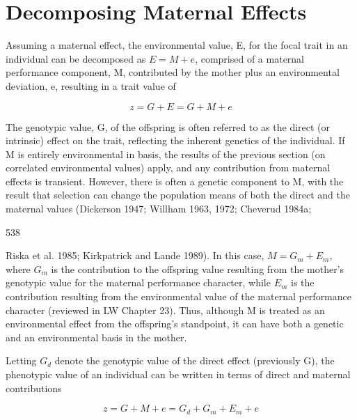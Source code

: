 \documentclass{article}
\begin{document}
\section{Decomposing Maternal Effects}
Assuming a maternal effect, the environmental value, E, for the focal trait in an individual can be decomposed as  $ E = M + e $, comprised of a maternal performance component, M, contributed by the mother plus an environmental deviation, e, resulting in a trait value of

\begin{equation}
z=G+E=G+M+e
\tag{15.20a}
\label{eq:15_20a}
\end{equation}

The genotypic value, G, of the offspring is often referred to as the direct (or intrinsic) effect on the trait, reflecting the inherent genetics of the individual. If M is entirely environmental in basis, the results of the previous section (on correlated environmental values) apply, and any contribution from maternal effects is transient. However, there is often a genetic component to M, with the result that selection can change the population means of both the direct and the maternal values (Dickerson 1947; Willham 1963, 1972; Cheverud 1984a;

538

Riska et al. 1985; Kirkpatrick and Lande 1989). In this case,  $ M = G_m + E_m $, where  $ G_m $ is the contribution to the offspring value resulting from the mother's genotypic value for the maternal performance character, while  $ E_m $ is the contribution resulting from the environmental value of the maternal performance character (reviewed in LW Chapter 23). Thus, although M is treated as an environmental effect from the offspring's standpoint, it can have both a genetic and an environmental basis in the mother.

Letting  $ G_{d} $ denote the genotypic value of the direct effect (previously G), the phenotypic value of an individual can be written in terms of direct and maternal contributions

\begin{equation}
z=G+M+e=G_{d}+G_{m}+E_{m}+e
\tag{15.20b}
\label{eq:15_20b}
\end{equation}
\end{document}
